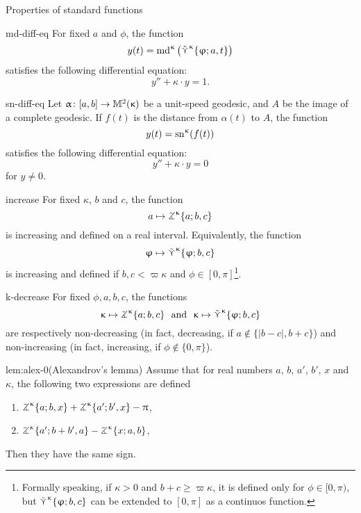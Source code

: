 \begin{thm}{Properties of standard functions}\label{md-equalities}

\begin{subthm}{md-diff-eq}
For fixed $a$ and $\phi$, the function 
\[y(t)=\mathrm{md}^{\upkappa}\left(\mathop{\tilde\curlyvee}\nolimits^{\upkappa}\{\upvarphi;a,t\}\right)\]
 satisfies the following differential equation:
\[y''+\kappa\cdot y=1.\]
\end{subthm}

\begin{subthm}{sn-diff-eq}
Let $\alpha\:[a,b]\to\Lob2\kappa$ be a unit-speed geodesic, and $A$ be the image of a complete geodesic.  If $f(t)$ is the distance from $\alpha(t)$ to $A$, the function 
\[y(t)=\mathrm{sn}^{\upkappa} (f(t))\]
 satisfies the following differential equation:
\[y''+\kappa\cdot y=0\]
for $y\ne 0$.
\end{subthm}

\begin{subthm}{increase}
For fixed $\kappa$, $b$ and $c$, the function 
\[a\mapsto\tangle\mc\kappa\{a;b,c\}\]
is increasing and defined on a real interval.
Equivalently, the function
\[\phi\mapsto\side\kappa \{\phi;b,c\}\]
is increasing and defined if $b,c<\varpi\kappa$ and $\phi\in[0,\pi]$\footnote{Formally speaking, if $\kappa>0$ and $b+c\ge \varpi\kappa$, it is defined only for $\phi\in[0,\pi)$, but $\mathop{\tilde\curlyvee}\nolimits^{\upkappa} \{\upvarphi;b,c\}$ can be extended to $[0,\pi]$ as a continuos function.}.
\end{subthm}

\begin{subthm}{k-decrease}
For fixed $\phi,a,b,c$, the functions
\[\kappa\mapsto \tangle\mc\kappa\{a;b,c\}\ \ \text{and}\ \ \kappa\mapsto \side\kappa \{\phi;b,c\}\]
are respectively non-decreasing (in fact, decreasing, if $a\notin\{|b-c|, b+c\}$) and non-increasing (in fact, increasing, if $\phi\notin\{0,\pi\}$).
\end{subthm}

\begin{subthm}{lem:alex-0}(Alexandrov's lemma)
Assume that for real numbers $a$, $b$, $a'$, $b'$, $x$ and $\kappa$, the following two expressions are defined
\begin{enumerate}
\item $\tangle\mc\kappa\{a;b,x\}+\tangle\mc\kappa\{a';b',x\}-\pi$,
\item $\tangle\mc\kappa\{a';b+b',a\}-\tangle\mc\kappa\{x;a,b\}$,
\end{enumerate}
Then they have the same sign.
\end{subthm}
\end{thm}



